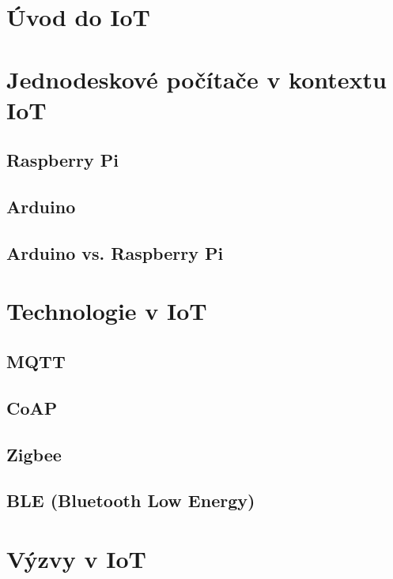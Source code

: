 
\section{Úvod do IoT}

\section{Jednodeskové počítače v kontextu IoT}

\subsection{Raspberry Pi}

\subsection{Arduino}
\subsection{Arduino vs. Raspberry Pi}

\section{Technologie v IoT}

\subsection{MQTT}

\subsection{CoAP}

\subsection{Zigbee}

\subsection{BLE (Bluetooth Low Energy)}

\section{Výzvy v IoT}
